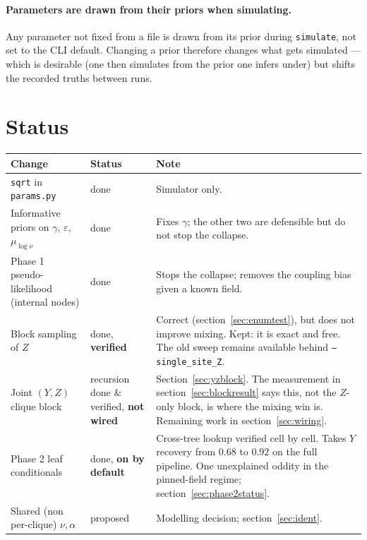 \documentclass[11pt,a4paper]{article}
\newcommand{\Ys}{Y}
\begin{document}
\paragraph{Parameters are drawn from their priors when simulating.} Any parameter not fixed
from a file is drawn from its prior during \texttt{simulate}, not set to the CLI default.
Changing a prior therefore changes what gets simulated --- which is desirable (one then
simulates from the prior one infers under) but shifts the recorded truths between runs.

\section{Status}
\label{sec:status}

\begin{center}
\begin{tabular}{llp{6.2cm}}
\toprule
Change & Status & Note\\
\midrule
\texttt{sqrt} in \texttt{params.py}      & done & Simulator only.\\
Informative priors on $\gamma$, $\varepsilon$, $\mu_{\log\nu}$ & done &
  Fixes $\gamma$; the other two are defensible but do not stop the collapse.\\
Phase 1 pseudo-likelihood (internal nodes) & done & Stops the collapse; removes the
  coupling bias given a known field.\\
Block sampling of $Z$                    & done, \textbf{verified} &
  Correct (section~\ref{sec:enumtest}), but does not improve mixing. Kept: it is exact and
  free. The old sweep remains available behind \texttt{--single\_site\_Z}.\\
Joint $(\Ys,Z)$ clique block             & recursion done \& verified, \textbf{not wired} &
  Section~\ref{sec:yzblock}. The measurement in section~\ref{sec:blockresult} says this, not
  the $Z$-only block, is where the mixing win is. Remaining work in
  section~\ref{sec:wiring}.\\
Phase 2 leaf conditionals                & done, \textbf{on by default} &
  Cross-tree lookup verified cell by cell. Takes $\Ys$ recovery from $0.68$ to $0.92$ on the
  full pipeline. One unexplained oddity in the pinned-field regime;
  section~\ref{sec:phase2status}.\\
Shared (non per-clique) $\nu, \alpha$    & proposed & Modelling decision;
  section~\ref{sec:ident}.\\
\bottomrule
\end{tabular}
\end{center}
\end{document}
